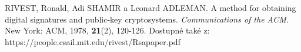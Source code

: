 \begin{thebibliography}{1}

RIVEST, Ronald, Adi SHAMIR a Leonard ADLEMAN. A method for obtaining digital signatures and public-key cryptosystems. \textit{Communications of the ACM}. New York: ACM, 1978, \textbf{21}(2), 120-126. Dostupné také z: https://people.csail.mit.edu/rivest/Rsapaper.pdf

\end{thebibliography}